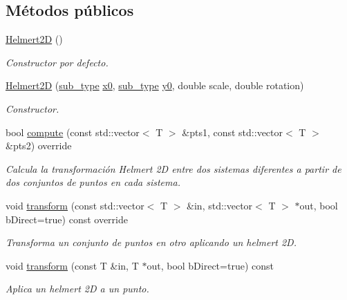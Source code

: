\subsection*{Métodos públicos}
\begin{DoxyCompactItemize}
\item 
\hyperlink{class_i3_d_1_1_helmert2_d_a8eca7720410824fb11469d8d893fb2d6}{Helmert2D} ()
\begin{DoxyCompactList}\small\item\em Constructor por defecto. \end{DoxyCompactList}\item 
\hyperlink{class_i3_d_1_1_helmert2_d_a810553f036b0e7ecf77e31246dc8edea}{Helmert2D} (\hyperlink{class_i3_d_1_1_transform_ac087b4b8b9acb1b11a6caa2231d598c7}{sub\+\_\+type} \hyperlink{class_i3_d_1_1_helmert2_d_ad0bb6ad335ff383cf85f29a3da60c2e7}{x0}, \hyperlink{class_i3_d_1_1_transform_ac087b4b8b9acb1b11a6caa2231d598c7}{sub\+\_\+type} \hyperlink{class_i3_d_1_1_helmert2_d_a60ddf8a70434410bc53e610abf583dbe}{y0}, double scale, double rotation)
\begin{DoxyCompactList}\small\item\em Constructor. \end{DoxyCompactList}\item 
bool \hyperlink{group__trf2_d_group_ga300279dee0a002835c25322bd2ea9398}{compute} (const std\+::vector$<$ T $>$ \&pts1, const std\+::vector$<$ T $>$ \&pts2) override
\begin{DoxyCompactList}\small\item\em Calcula la transformación Helmert 2D entre dos sistemas diferentes a partir de dos conjuntos de puntos en cada sistema. \end{DoxyCompactList}\item 
void \hyperlink{group__trf2_d_group_gab7354b67b291bf01b3fd045578598fb1}{transform} (const std\+::vector$<$ T $>$ \&in, std\+::vector$<$ T $>$ $\ast$out, bool b\+Direct=true) const  override
\begin{DoxyCompactList}\small\item\em Transforma un conjunto de puntos en otro aplicando un helmert 2D. \end{DoxyCompactList}\item 
void \hyperlink{group__trf2_d_group_ga11e1634259f4e3085840a16c3bfb314e}{transform} (const T \&in, T $\ast$out, bool b\+Direct=true) const 
\begin{DoxyCompactList}\small\item\em Aplica un helmert 2D a un punto. \end{DoxyCompactList}\item 

\end{DoxyCompactItemize}
